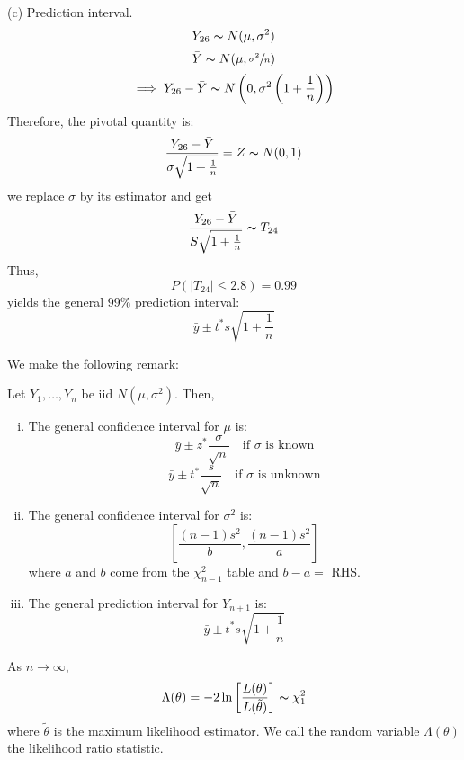 \begin{exbox}
\begin{example}
        (c) Prediction interval.
        \[ Y_{26} \thicksim N(\mu,\sigma^2) \]
        \[ \bar{Y} \thicksim N(\mu,\sfrac{\sigma^2}{n}) \]
        \[ \implies Y_{26}-\bar{Y} \thicksim N\left(0,\sigma^2\left( 1+\frac{1}{n}  \right)\right) \]
        Therefore, the pivotal quantity is:
        \[ \frac{Y_{26}-\bar{Y}}{\sigma \sqrt{1+\frac{1}{n}}} =Z \thicksim N(0,1) \]
        we replace $ \sigma $ by its estimator and get
        \[ \frac{Y_{26}-\bar{Y}}{S \sqrt{1+\frac{1}{n}}} \thicksim T_{24} \]
        Thus,
        \[ P(|T_{24}|\leqslant 2.8)=0.99 \]
        yields the general $ 99\% $ prediction interval:
        \[ \bar{y}\pm t^* s \sqrt{1+\frac{1}{n}} \]
    \end{example}
\end{exbox}
We make the following remark:
\begin{remark} Let $ Y_1,\ldots ,Y_{n} $ be iid $ N(\mu,\sigma^2) $. Then,
    \begin{enumerate}[(i)]
        \item The general confidence interval for $ \mu $ is:
              \[ \bar{y}\pm z^* \frac{\sigma}{\sqrt{n}} \quad\text{if $\sigma$ is known} \]
              \[ \bar{y}\pm t^* \frac{s}{\sqrt{n}} \quad\text{if $\sigma$ is unknown} \]
        \item The general confidence interval for $ \sigma^2 $ is:
              \[ \left[ \frac{(n-1)s^2}{b} ,\frac{(n-1)s^2}{a} \right] \]
              where $ a $ and $ b $ come from the $ \chi^2_{n-1} $ table
              and $ b-a= $ RHS.
        \item The general prediction interval for $ Y_{n+1} $ is:
              \[ \bar{y}\pm t^* s \sqrt{1+\frac{1}{n}} \]
    \end{enumerate}
\end{remark}

\begin{thmbox}
    \begin{theorem}
        As $ n\to \infty $,
        \[ \Lambda(\theta)=-2\ln\left[  \frac{L(\theta)}{L(\tilde{\theta})} \right] \thicksim \chi^2_1  \]
        where $ \tilde{\theta} $ is the maximum likelihood estimator. We call the random
        variable $ \Lambda(\theta) $ the likelihood ratio statistic.
    \end{theorem}
\end{thmbox}

